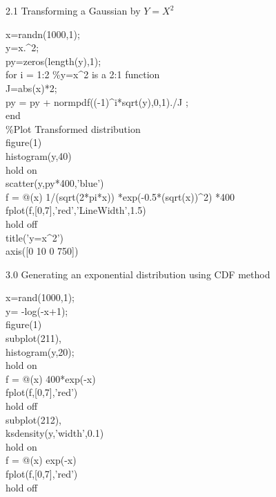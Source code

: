 \documentclass[twoside,twocolumn]{article}
\begin{document}
\begin{large}
2.1 Transforming a Gaussian by $Y=X^2$
\end{large}
\newline
\begin{itshape}
x=randn(1000,1);\\
y=x.\^{}2;   \\
py=zeros(length(y),1);\\
for i = 1:2 \%y=x\^{}2 is a 2:1 function\\
    J=abs(x)*2;\\
    py = py + normpdf((-1)\^{}i*sqrt(y),0,1)./J ;\\
end\\

\%Plot Transformed distribution\\
figure(1)\\
histogram(y,40)\\
hold on\\
scatter(y,py*400,'blue')\\
f = @(x) 1/(sqrt(2*pi*x)) *exp(-0.5*(sqrt(x))\^{}2) *400\\
fplot(f,[0,7],'red','LineWidth',1.5)\\
hold off\\
title('y=x\^{}2')\\
axis([0 10 0 750])\\
\end{itshape}

\begin{large}
3.0 Generating an exponential distribution using CDF method
\end{large}
\newline
\begin{itshape}
x=rand(1000,1);\\
y= -log(-x+1);\\

figure(1)\\
subplot(211),\\
histogram(y,20);\\
hold on \\
f = @(x) 400*exp(-x)\\
fplot(f,[0,7],'red')\\
hold off\\
subplot(212),\\
ksdensity(y,'width',0.1)\\
hold on \\
f = @(x) exp(-x)\\
fplot(f,[0,7],'red')\\
hold off\\
\end{itshape}
\end{document}
